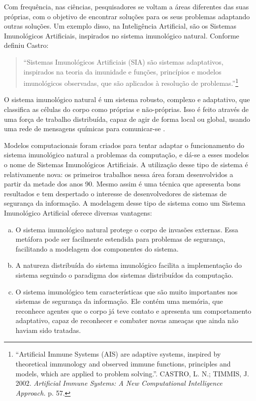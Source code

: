 Com frequência, nas ciências, pesquisadores se voltam a áreas diferentes das suas próprias, com o objetivo de encontrar soluções para os seus problemas adaptando outras soluções. Um exemplo disso, na Inteligência Artificial, são os Sistemas Imunológicos Artificiais, inspirados no sistema imunológico natural. Conforme definiu Castro:

\begin{quote}
``Sistemas Imunológicos Artificiais (SIA) são sistemas adaptativos, inspirados na teoria da imunidade e funções, princípios e modelos imunológicos observadas, que são aplicados à resolução de problemas.''\footnote{``Artificial Immune Systems (AIS) are adaptive systems, inspired by theoretical immunology and observed immune functions, principles and models, which are applied to problem solving.''. CASTRO, L. N.; TIMMIS, J. 2002. \emph{Artificial Immune Systems: A New Computational Intelligence Approach.} p. 57.}
\end{quote}

O sistema imunológico natural é um sistema robusto, complexo e adaptativo, que classifica as células do corpo como próprias e não-próprias. Isso é feito através de uma força de trabalho distribuída, capaz de agir de forma local ou global, usando uma rede de mensagens químicas para comunicar-se \cite{Aickelin2005}.

Modelos computacionais foram criados para tentar adaptar o funcionamento do sistema imunológico natural a problemas da computação, e dá-se a esses modelos o nome de Sistemas Imunológicos Artificiais. A utilização desse tipo de sistema é relativamente nova: os primeiros trabalhos nessa área foram desenvolvidos a partir da metade dos anos 90. Mesmo assim é uma técnica que apresenta bons resultados e tem despertado o interesse de desenvolvedores de sistemas de segurança da informação. A modelagem desse tipo de sistema como um Sistema Imunológico Artificial oferece diversas vantagens:

\begin{enumerate}[a)]
\item O sistema imunológico natural protege o corpo de invasões externas. Essa metáfora pode ser facilmente estendida para problemas de segurança, facilitando a modelagem dos componentes do sistema.
\item A natureza distribuída do sistema imunológico facilita a implementação do sistema seguindo o paradigma dos sistemas distribuídos da computação.
\item O sistema imunológico tem características que são muito importantes nos sistemas de segurança da informação. Ele contém uma memória, que reconhece agentes que o corpo já teve contato e apresenta um comportamento adaptativo, capaz de reconhecer e combater novas ameaças que ainda não haviam sido tratadas.
\end{enumerate}

